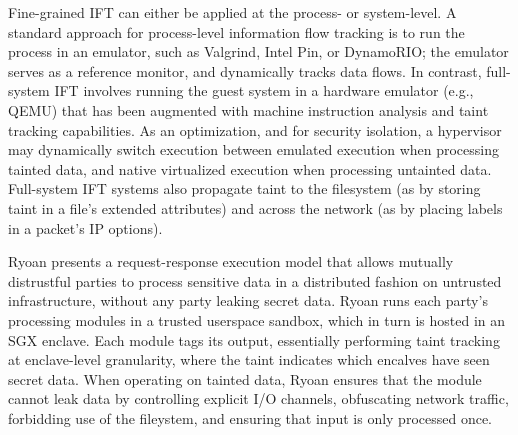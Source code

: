 Fine-grained IFT can either be applied at the process- or system-level.
%
A standard approach for process-level information flow tracking is to run
the process in an emulator, such as Valgrind, Intel Pin, or DynamoRIO; the
emulator serves as a reference monitor, and dynamically tracks data flows.
%
In contrast, full-system IFT involves running the guest system in a hardware
emulator (e.g., QEMU) that has been augmented with machine instruction analysis
and taint tracking capabilities.
%
As an optimization, and for security isolation, a hypervisor may dynamically
switch execution between emulated execution when processing tainted data, and
native virtualized execution when processing untainted data.
%
Full-system IFT systems also propagate taint to the filesystem (as by storing
taint in a file's extended attributes) and across the network (as by placing
labels in a packet's IP options).


%
Ryoan presents a request-response execution model that allows mutually
distrustful parties to process sensitive data in a distributed fashion on
untrusted infrastructure, without any party leaking secret data.
%
Ryoan runs each party's processing modules in a trusted userspace sandbox,
which in turn is hosted in an SGX enclave.
%
Each module tags its output, essentially performing taint tracking at
enclave-level granularity, where the taint indicates which encalves have seen
secret data.
%
When operating on tainted data, Ryoan ensures that the module cannot leak data
by controlling explicit I/O channels, obfuscating network traffic, forbidding
use of the fileystem, and ensuring that input is only processed once.


